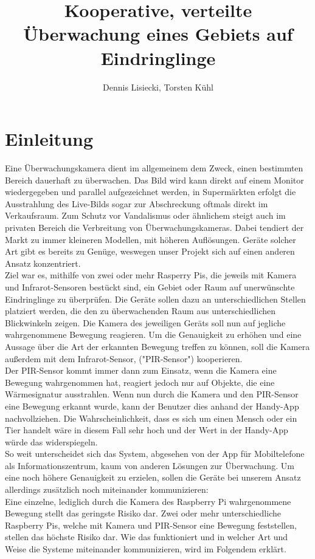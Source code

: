 \documentclass[journal]{IEEEtran}
\title{Kooperative, verteilte Überwachung eines Gebiets auf Eindringlinge}		%
\author{Dennis Lisiecki, Torsten Kühl}								%
\begin{document}

\maketitle	%




\section{Einleitung}
Eine Überwachungskamera dient im allgemeinem dem Zweck, einen bestimmten Bereich dauerhaft zu überwachen. Das Bild wird kann direkt auf einem Monitor wiedergegeben und parallel aufgezeichnet werden, in Supermärkten erfolgt die Ausstrahlung des Live-Bilds sogar zur Abschreckung oftmals direkt im Verkaufsraum. Zum Schutz vor Vandalismus oder ähnlichem steigt auch im privaten Bereich die Verbreitung von Überwachungskameras. Dabei tendiert der Markt zu immer kleineren Modellen, mit höheren Auflösungen. Geräte solcher Art gibt es bereits zu Genüge, weswegen unser Projekt sich auf einen anderen Ansatz konzentriert.\\ Ziel war es, mithilfe von zwei oder mehr Rasperry Pis, die jeweils mit Kamera und Infrarot-Sensoren bestückt sind, ein Gebiet oder Raum auf unerwünschte Eindringlinge zu überprüfen. Die Geräte sollen dazu an unterschiedlichen Stellen platziert werden, die den zu überwachenden Raum aus unterschiedlichen Blickwinkeln zeigen. Die Kamera des jeweiligen Geräts soll nun auf jegliche wahrgenommene Bewegung reagieren. Um die Genauigkeit zu erhöhen und eine Aussage über die Art der erkannten Bewegung treffen zu können, soll die Kamera außerdem mit dem Infrarot-Sensor, ("PIR-Sensor") kooperieren.\\ Der PIR-Sensor kommt immer dann zum Einsatz, wenn die Kamera eine Bewegung wahrgenommen hat, reagiert jedoch nur auf Objekte, die eine Wärmesignatur ausstrahlen. Wenn nun durch die Kamera und den PIR-Sensor eine Bewegung erkannt wurde, kann der Benutzer dies anhand der Handy-App nachvollziehen. Die Wahrscheinlichkeit, dass es sich um einen Mensch oder ein Tier handelt wäre in diesem Fall sehr hoch und der Wert in der Handy-App würde das widerspiegeln.\\ So weit unterscheidet sich das System, abgesehen von der App für Mobiltelefone als Informationszentrum, kaum von anderen Lösungen zur Überwachung. Um eine noch höhere Genauigkeit zu erzielen, sollen die Geräte bei unserem Ansatz allerdings zusätzlich noch miteinander kommunizieren:\\ Eine einzelne, lediglich durch die Kamera des Raspberry Pi wahrgenommene Bewegung stellt das geringste Risiko dar. Zwei oder mehr unterschiedliche Raspberry Pis, welche mit Kamera und PIR-Sensor eine Bewegung feststellen, stellen das höchste Risiko dar. Wie das funktioniert und in welcher Art und Weise die Systeme miteinander kommunizieren, wird im Folgendem erklärt.
\end{document}
